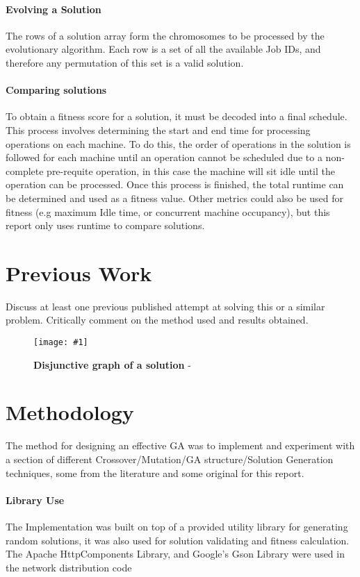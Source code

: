\documentclass[14pt]{acmsiggraph}
\newcommand{\figuremacroW}[4]{
	\begin{figure}[h] %
		\centering
		\texttt{[image: \#1]}
		\caption[#2]{\textbf{#2} - #3}
		\label{fig:#1}
	\end{figure}
}
\begin{document}
\paragraph{Evolving a Solution}
The rows of a solution array form the chromosomes to be processed by the evolutionary algorithm. Each row is a set of all the available Job IDs, and therefore any permutation of this set is a valid solution. 

\paragraph{Comparing solutions}
To obtain a fitness score for a solution, it must be decoded into a final schedule. This process involves determining the start and end time for processing operations on each machine. To do this, the order of operations in the solution is followed for each machine until an operation cannot be scheduled due to a non-complete pre-requite operation, in this case the machine will sit idle until the operation can be processed. Once this process is finished, the total runtime can be determined and used as a fitness value. Other metrics could also be used for fitness (e.g maximum Idle time, or concurrent machine occupancy), but this report only uses runtime to compare solutions.

\section{Previous  Work}
Discuss at least one previous published attempt at solving this or a similar problem. 
Critically comment on the method used and results obtained.
\figuremacroW
{chart}
{Disjunctive graph of a solution}
{\cite{gao2011efficient}}
{1.0}

\section{Methodology}
The method for designing an effective GA was to implement and experiment with a section of different Crossover/Mutation/GA structure/Solution Generation techniques, some from the literature and some original for this report.

\paragraph{Library Use}
The Implementation was built on top of a provided utility library for generating random solutions, it was also used for solution validating and fitness calculation.\\
The Apache HttpComponents Library, and Google's Gson Library were used in the network distribution code
\end{document}
